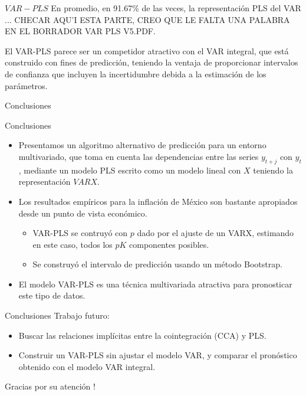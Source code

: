 \documentclass{beamer}
\newcommand{\?}{?`}
\begin{document}
\begin{frame}{$VAR-PLS$}
  En promedio, en 91.67\% de las veces, la representaci\'on PLS del VAR
  ... CHECAR AQU'I ESTA PARTE, CREO QUE LE FALTA UNA PALABRA EN EL
  BORRADOR VAR PLS V5.PDF.

  \bigskip

  El VAR-PLS parece ser un competidor atractivo con el VAR integral,
  que est\'a construido con fines de predicci\'on, teniendo la ventaja
  de proporcionar intervalos de confianza que incluyen la
  incertidumbre debida a la estimaci\'on de los par\'ametros. 
\end{frame}

\begin{frame}{}
  \begin{block}{}
    \begin{center}
      \vspace{3mm}
      {\Large Conclusiones}
      \vspace{3mm}
    \end{center}
  \end{block}
\end{frame}

\begin{frame}{Conclusiones}
  \begin{itemize}
  \item Presentamos un algoritmo alternativo de predicci\'on para un
    entorno multivariado, que toma en cuenta las dependencias entre
    las series $y_{t+j}$ con $y_t$, mediante un modelo PLS escrito
    como un modelo lineal con $X$ teniendo la representaci\'on $VARX$.
  \item Los resultados emp\'iricos para la inflaci\'on de M\'exico son
    bastante apropiados desde un punto de vista econ\'omico.
    \begin{itemize}
    \item VAR-PLS se contruy\'o con $p$ dado por el ajuste de un VARX,
      estimando en este caso, todos los $pK$ componentes posibles.
    \item Se construy\'o el intervalo de predicci\'on usando un
      m\'etodo Bootstrap.
    \end{itemize}
  \item El modelo VAR-PLS es una t\'ecnica multivariada atractiva para
    pronosticar este tipo de datos.
  \end{itemize}
\end{frame}

\begin{frame}{Conclusiones}
  Trabajo futuro:
  \begin{itemize}
  \item Buscar las relaciones impl\'icitas entre la cointegraci\'on
    (CCA) y PLS.
  \item Construir un VAR-PLS sin ajustar el modelo VAR, y comparar el
    pron\'ostico obtenido con el modelo VAR integral.
  \end{itemize}

\end{frame}

\begin{frame}{}
  \begin{block}{}
    \begin{center}
      \vspace{3mm}
      {\Large Gracias por su atenci\'on !}
      \vspace{3mm}
    \end{center}
  \end{block}
\end{frame}
\end{document}
